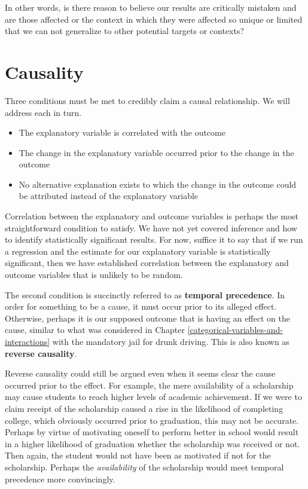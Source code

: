 \documentclass[
]{book}
\providecommand{\tightlist}{%
  \setlength{\itemsep}{0pt}\setlength{\parskip}{0pt}}
\begin{document}
In other words, is there reason to believe our results are critically mistaken and are those affected or the context in which they were affected so unique or limited that we can not generalize to other potential targets or contexts?

\hypertarget{causality}{%
\section{Causality}\label{causality}}

Three conditions must be met to credibly claim a causal relationship. We will address each in turn.

\begin{itemize}
\tightlist
\item
  The explanatory variable is correlated with the outcome
\item
  The change in the explanatory variable occurred prior to the change in the outcome
\item
  No alternative explanation exists to which the change in the outcome could be attributed instead of the explanatory variable
\end{itemize}

Correlation between the explanatory and outcome variables is perhaps the most straightforward condition to satisfy. We have not yet covered inference and how to identify statistically significant results. For now, suffice it to say that if we run a regression and the estimate for our explanatory variable is statistically significant, then we have established correlation between the explanatory and outcome variables that is unlikely to be random.

The second condition is succinctly referred to as \textbf{temporal precedence}. In order for something to be a cause, it must occur prior to its alleged effect. Otherwise, perhaps it is our supposed outcome that is having an effect on the cause, similar to what was considered in Chapter \ref{categorical-variables-and-interactions} with the mandatory jail for drunk driving. This is also known as \textbf{reverse causality}.

Reverse causality could still be argued even when it seems clear the cause occurred prior to the effect. For example, the mere availability of a scholarship may cause students to reach higher levels of academic achievement. If we were to claim receipt of the scholarship caused a rise in the likelihood of completing college, which obviously occurred prior to graduation, this may not be accurate. Perhaps by virtue of motivating oneself to perform better in school would result in a higher likelihood of graduation whether the scholarship was received or not. Then again, the student would not have been as motivated if not for the scholarship. Perhaps the \emph{availability} of the scholarship would meet temporal precedence more convincingly.
\end{document}

